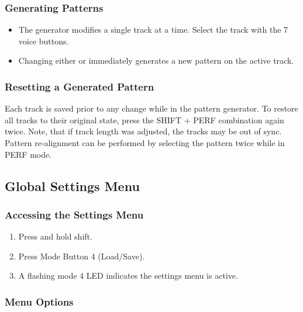 \subsubsection{Generating Patterns}\label{generating-patterns}

\begin{itemize}
\tightlist
\item
  The generator modifies a single track at a time. Select the track with
  the 7 voice buttons.
\item
  Changing either  or  immediately generates a new
  pattern on the active track.
\end{itemize}


\subsubsection{Resetting a Generated
Pattern}\label{resetting-a-generated-pattern}

Each track is saved prior to any change while in the pattern generator.
To restore all tracks to their original state, press the SHIFT + PERF
combination again twice. Note, that if track length was adjusted, the
tracks may be out of sync. Pattern re-alignment can be performed by
selecting the pattern twice while in PERF mode.

\subsection{Global Settings Menu}\label{global-settings-menu}

\subsubsection{Accessing the Settings
Menu}\label{accessing-the-settings-menu}

\begin{enumerate}
\def\labelenumi{\arabic{enumi}.}
\tightlist
\item
  Press and hold shift.
\item
  Press Mode Button 4 (Load/Save).
\item
  A flashing mode 4 LED indicates the settings menu is active.
\end{enumerate}

\subsubsection{Menu Options}\label{menu-options}

